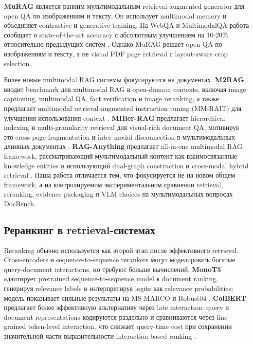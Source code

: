 \documentclass[conference]{IEEEtran}
\begin{document}
\textbf{MuRAG} является ранним мультимодальным retrieval-augmented generator для open QA по изображениям и тексту. Он использует multimodal memory и объединяет contrastive и generative training. На WebQA и MultimodalQA работа сообщает о state-of-the-art accuracy с абсолютным улучшением на 10-20\% относительно предыдущих систем \cite{murag2022}. Однако MuRAG решает open QA по изображениям и тексту, а не visual PDF page retrieval с layout-aware crop selection.

Более новые multimodal RAG системы фокусируются на документах. \textbf{M2RAG} вводит benchmark для multimodal RAG в open-domain contexts, включая image captioning, multimodal QA, fact verification и image reranking, а также предлагает multimodal retrieval-augmented instruction tuning (MM-RAIT) для улучшения использования context \cite{m2rag2025}. \textbf{MHier-RAG} предлагает hierarchical indexing и multi-granularity retrieval для visual-rich document QA, мотивируя это cross-page fragmentation и inter-modal disconnection в мультимодальных длинных документах \cite{mhierrag2025}. \textbf{RAG-Anything} предлагает all-in-one multimodal RAG framework, рассматривающий мультимодальный контент как взаимосвязанные knowledge entities и использующий dual-graph construction и cross-modal hybrid retrieval \cite{raganything2025}. Наша работа отличается тем, что фокусируется не на новом общем framework, а на контролируемом экспериментальном сравнении retrieval, reranking, evidence packaging и VLM choices на мультимодальных вопросах DocBench.

\subsection{Реранкинг в retrieval-системах}

Reranking обычно используется как второй этап после эффективного retrieval. Cross-encoders и sequence-to-sequence rerankers могут моделировать богатые query-document interactions, но требуют больше вычислений. \textbf{MonoT5} адаптирует pretrained sequence-to-sequence model к document ranking, генерируя relevance labels и интерпретируя logits как relevance probabilities; модель показывает сильные результаты на MS MARCO и Robust04 \cite{monot5-2020}. \textbf{ColBERT} предлагает более эффективную альтернативу через late interaction: query и document representations кодируются раздельно и сравниваются через fine-grained token-level interaction, что снижает query-time cost при сохранении значительной части выразительности interaction-based ranking \cite{colbert2020}.
\end{document}
